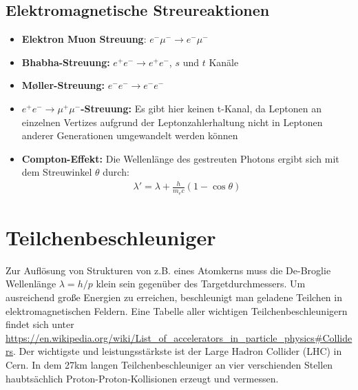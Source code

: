 \documentclass[final]{summery_5.0}
\begin{document}
\subsection{Elektromagnetische Streureaktionen}
\begin{itemize}
    \item{\bf Elektron Muon Streuung}: $e^- \mu^- \to e^- \mu^-$
    \item {\bf Bhabha-Streuung:} $e^+ e^- \to e^+ e^-$, $s$ und $t$ Kanäle
    \item{\bf Møller-Streuung:} $e^- e^- \to e^- e^-$
    \item $e^+ e^- \to \mu^+ \mu^-${\bf-Streuung:} Es gibt hier keinen t-Kanal, da Leptonen an einzelnen Vertizes aufgrund der
    Leptonzahlerhaltung nicht in Leptonen anderer Generationen umgewandelt
    werden können
    \item{\bf Compton-Effekt:} Die Wellenlänge des gestreuten Photons ergibt sich mit dem Streuwinkel \(\theta\) durch:
    \begin{align*}
        \lambda ' = \lambda + \frac h{m_e c} (1-\cos\theta)
    \end{align*}
\end{itemize}

\section{Teilchenbeschleuniger}
Zur Auflösung von Strukturen von z.B. eines Atomkerns muss die De-Broglie Wellenlänge \(\lambda= h / p\) klein sein gegenüber des Targetdurchmessers.
Um ausreichend große Energien zu erreichen, beschleunigt man geladene Teilchen in elektromagnetischen Feldern. Eine Tabelle aller wichtigen Teilchenbeschleunigern findet sich unter \url{https://en.wikipedia.org/wiki/List_of_accelerators_in_particle_physics#Colliders}. Der wichtigste und leistungsstärkste ist der Large Hadron Collider (LHC) in Cern. In dem 27km langen Teilchenbeschleuniger an vier verschienden Stellen haubtsächlich Proton-Proton-Kollisionen erzeugt und vermessen.
\end{document}
